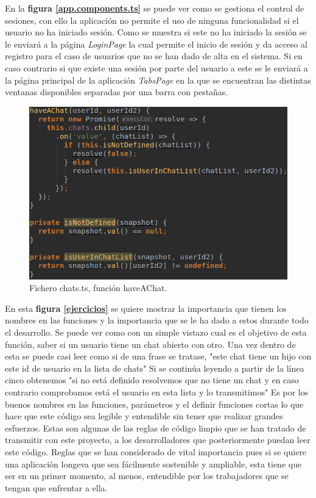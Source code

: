 \medskip
En la \textbf{figura \ref{app.components.ts}} se puede ver como se gestiona
el control de sesiones, con ello la aplicación no permite el uso de ninguna
funcionalidad si el usuario no ha iniciado sesión. Como se muestra si este
no ha iniciado la sesión se le enviará a la página \textit{LoginPage} la cual
permite el inicio de sesión y da acceso al registro para el caso de usuarios
que no se han dado de alta en el sistema. Si en caso contrario si que existe
una sesión por parte del usuario a este se le enviará a la página principal
de la aplicación \textit{TabsPage} en la que se encuentran las distintas
ventanas disponibles separadas por una barra con pestañas.

\begin{figure}
    \includegraphics[width=\linewidth]{./images/code/chats-provider-haveAChar.png}
    \caption{Fichero chats.ts, función haveAChat.}
    \label{chats.ts.provider}
\end{figure}

\medskip
En esta \textbf{figura \ref{ejercicios}} se quiere mostrar la importancia que
tienen los nombres en las funciones y la importancia que se le ha dado a
estos durante todo el desarrollo. Se puede ver como con un simple vistazo
cual es el objetivo de esta función, saber si un usuario tiene un
chat abierto con otro. Una vez dentro de esta se puede casi leer como
si de una frase se tratase, "este chat tiene un hijo con este id de usuario
en la lista de chats" Si se continúa leyendo a partir de la línea cinco
obtenemos "si no está definido resolvemos que no tiene un chat y en
caso contrario comprobamos está el usuario en esta lista y lo transmitimos"
Es por los buenos nombres en las funciones, parámetros y el definir funciones
cortas lo que hace que este código sea legible y entendible sin tener
que realizar grandes esfuerzos. Estas son algunas de las reglas de código limpio\cite{clean-code}
que se han tratado de transmitir con este proyecto, a los desarrolladores
que posteriormente puedan leer este código. Reglas que se han considerado
de vital importancia pues si se quiere una aplicación longeva que sea fácilmente
sostenible y ampliable, esta tiene que ser en un primer momento, al menos,
entendible por los trabajadores que se tengan que enfrentar a ella.


